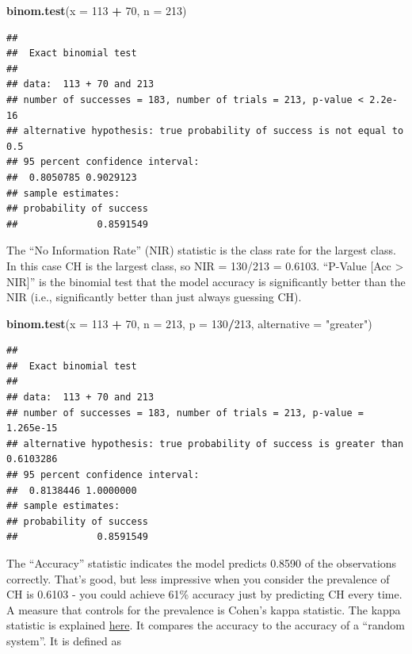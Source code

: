 \documentclass[
]{book}
\newenvironment{Shaded}{\begin{snugshade}}{\end{snugshade}}
\newcommand{\DataTypeTok}[1]{\textcolor[rgb]{0.13,0.29,0.53}{#1}}
\newcommand{\DecValTok}[1]{\textcolor[rgb]{0.00,0.00,0.81}{#1}}
\newcommand{\KeywordTok}[1]{\textcolor[rgb]{0.13,0.29,0.53}{\textbf{#1}}}
\newcommand{\NormalTok}[1]{#1}
\newcommand{\OperatorTok}[1]{\textcolor[rgb]{0.81,0.36,0.00}{\textbf{#1}}}
\newcommand{\StringTok}[1]{\textcolor[rgb]{0.31,0.60,0.02}{#1}}
\begin{document}
\begin{Shaded}
\begin{Highlighting}[]
\KeywordTok{binom.test}\NormalTok{(}\DataTypeTok{x =} \DecValTok{113} \OperatorTok{+}\StringTok{ }\DecValTok{70}\NormalTok{, }\DataTypeTok{n =} \DecValTok{213}\NormalTok{)}
\end{Highlighting}
\end{Shaded}

\begin{verbatim}
## 
##  Exact binomial test
## 
## data:  113 + 70 and 213
## number of successes = 183, number of trials = 213, p-value < 2.2e-16
## alternative hypothesis: true probability of success is not equal to 0.5
## 95 percent confidence interval:
##  0.8050785 0.9029123
## sample estimates:
## probability of success 
##              0.8591549
\end{verbatim}

The ``No Information Rate'' (NIR) statistic is the class rate for the largest class. In this case CH is the largest class, so NIR = 130/213 = 0.6103. ``P-Value {[}Acc \textgreater{} NIR{]}'' is the binomial test that the model accuracy is significantly better than the NIR (i.e., significantly better than just always guessing CH).

\begin{Shaded}
\begin{Highlighting}[]
\KeywordTok{binom.test}\NormalTok{(}\DataTypeTok{x =} \DecValTok{113} \OperatorTok{+}\StringTok{ }\DecValTok{70}\NormalTok{, }\DataTypeTok{n =} \DecValTok{213}\NormalTok{, }\DataTypeTok{p =} \DecValTok{130}\OperatorTok{/}\DecValTok{213}\NormalTok{, }\DataTypeTok{alternative =} \StringTok{"greater"}\NormalTok{)}
\end{Highlighting}
\end{Shaded}

\begin{verbatim}
## 
##  Exact binomial test
## 
## data:  113 + 70 and 213
## number of successes = 183, number of trials = 213, p-value = 1.265e-15
## alternative hypothesis: true probability of success is greater than 0.6103286
## 95 percent confidence interval:
##  0.8138446 1.0000000
## sample estimates:
## probability of success 
##              0.8591549
\end{verbatim}

The ``Accuracy'' statistic indicates the model predicts 0.8590 of the observations correctly. That's good, but less impressive when you consider the prevalence of CH is 0.6103 - you could achieve 61\% accuracy just by predicting CH every time. A measure that controls for the prevalence is Cohen's kappa statistic. The kappa statistic is explained \href{https://standardwisdom.com/softwarejournal/2011/12/confusion-matrix-another-single-value-metric-kappa-statistic/}{here}. It compares the accuracy to the accuracy of a ``random system''. It is defined as
\end{document}
